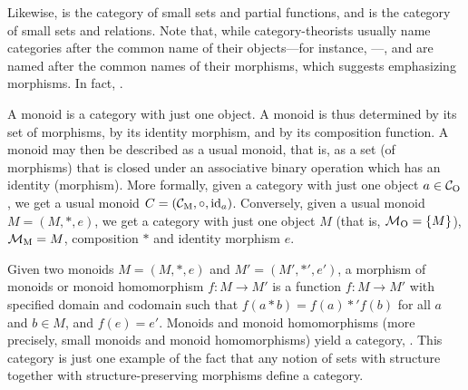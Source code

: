 \begin{example}


  \label{ex:par-rel}




  Likewise,  is the category of small sets and partial
  functions, and  is the category of small sets and
  relations. Note that, while category-theorists usually name
  categories after the common name of their objects---for instance,
  \set---,  and  are named after the common
  names of their morphisms, which suggests emphasizing morphisms. In
  fact, .

\end{example}

\begin{example}
  [Monoids]



  \label{ex:monoid}


  A monoid is a category with just one object. A monoid is thus
  determined by its set of morphisms, by its identity morphism, and by
  its composition function. A monoid may then be described as a usual
  monoid, that is, as a set (of morphisms) that is closed under an
  associative binary operation which has an identity (morphism). More
  formally, given a category  with just one object $a \in
  \mathcal{C}_{\operatorname{O}}$, we get a usual monoid $C = (\mathcal{C}_{\operatorname{M}}, \mathrel{\circ}, \operatorname{id}_{a})$.
  Conversely, given a usual monoid $M = (M, *, e)$, we get a category
   with just one object $M$ (that is, $\mathcal{M}_{\operatorname{O}} = \{M\}$),
  $\mathcal{M}_{\operatorname{M}} = M$, composition $*$ and identity morphism $e$.



  Given two monoids $M = (M, *, e)$ and $M' = (M', *', e')$, a
  morphism of monoids or monoid homomorphism $f: M \to M'$ is a
  function $f: M \to M'$ with specified domain and codomain such that
  $f(a * b) = f(a) *' f(b)$ for all $a$ and $b \in M$, and $f(e) =
  e'$. Monoids and monoid homomorphisms (more precisely, small monoids
  and monoid homomorphisms) yield a category, . This
  category is just one example of the fact that any notion of sets
  with structure together with structure-preserving morphisms define a
  category.

\end{example}

